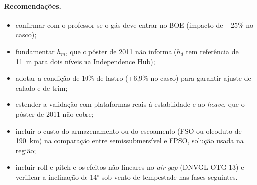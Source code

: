 \documentclass[11pt,a4paper]{article}
\begin{document}
\paragraph{Recomendações.}
\begin{itemize}
\item confirmar com o professor se o gás deve entrar no BOE (impacto de +25\% no casco);
\item fundamentar $h_m$, que o pôster de 2011 não informa ($h_d$ tem referência de 11~m para dois
níveis na Independence Hub);
\item adotar a condição de 10\% de lastro (+6,9\% no casco) para garantir ajuste de calado e de
trim;
\item estender a validação com plataformas reais à estabilidade e ao \emph{heave}, que o pôster
de 2011 não cobre;
\item incluir o custo do armazenamento ou do escoamento (FSO ou oleoduto de 190~km) na
comparação entre semissubmersível e FPSO, solução usada na região;
\item incluir roll e pitch e os efeitos não lineares no \emph{air gap} (DNVGL-OTG-13) e
verificar a inclinação de 14$^\circ$ sob vento de tempestade nas fases seguintes.
\end{itemize}
\end{document}
